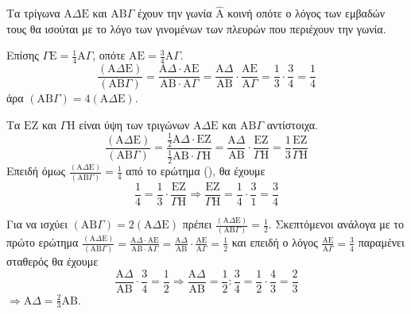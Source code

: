 \begin{alist}
    \item
    \begin{rlist}
        \item Τα τρίγωνα $\mathrm{A}\Delta\mathrm{E}$ και $\mathrm{AB}\Gamma$ έχουν την γωνία $\hat{\mathrm{A}}$ κοινή οπότε ο λόγος των εμβαδών τους θα ισούται με το λόγο των γινομένων των πλευρών που περιέχουν την γωνία.

        Επίσης $\Gamma\mathrm{E} = \frac{1}{4} \mathrm{A}\Gamma$, οπότε $\mathrm{A}\mathrm{E} = \frac{3}{4} \mathrm{A}\Gamma$.
        \[ \frac{(\mathrm{A}\Delta\mathrm{E})}{(\mathrm{AB}\Gamma)} = \frac{\mathrm{A}\Delta \cdot \mathrm{A}\mathrm{E}}{\mathrm{AB} \cdot \mathrm{A}\Gamma} = \frac{\mathrm{A}\Delta}{\mathrm{AB}} \cdot \frac{\mathrm{A}\mathrm{E}}{\mathrm{A}\Gamma} = \frac{1}{3} \cdot \frac{3}{4} = \frac{1}{4} \]
        άρα $(\mathrm{AB}\Gamma) = 4(\mathrm{A}\Delta\mathrm{E})$.

        \item Τα $\mathrm{EZ}$ και $\Gamma\mathrm{H}$ είναι ύψη των τριγώνων $\mathrm{A}\Delta\mathrm{E}$ και $\mathrm{AB}\Gamma$ αντίστοιχα.
        \[ \frac{(\mathrm{A}\Delta\mathrm{E})}{(\mathrm{AB}\Gamma)} = \frac{\frac{1}{2} \mathrm{A}\Delta \cdot \mathrm{EZ}}{\frac{1}{2} \mathrm{AB} \cdot \Gamma\mathrm{H}} = \frac{\mathrm{A}\Delta}{\mathrm{AB}} \cdot \frac{\mathrm{EZ}}{\Gamma\mathrm{H}} = \frac{1}{3} \frac{\mathrm{EZ}}{\Gamma\mathrm{H}} \]
        Επειδή όμως $\frac{(\mathrm{A}\Delta\mathrm{E})}{(\mathrm{AB}\Gamma)} = \frac{1}{4}$ από το ερώτημα (\textalpha), θα έχουμε
        \[ \frac{1}{4} = \frac{1}{3} \cdot \frac{\mathrm{EZ}}{\Gamma\mathrm{H}} \Rightarrow \frac{\mathrm{EZ}}{\Gamma\mathrm{H}} = \frac{1}{4} \cdot \frac{3}{1} = \frac{3}{4} \]
    \end{rlist}

    \item Για να ισχύει $(\mathrm{AB}\Gamma) = 2(\mathrm{A}\Delta\mathrm{E})$ πρέπει $\frac{(\mathrm{A}\Delta\mathrm{E})}{(\mathrm{AB}\Gamma)} = \frac{1}{2}$. Σκεπτόμενοι ανάλογα με το πρώτο ερώτημα $\frac{(\mathrm{A}\Delta\mathrm{E})}{(\mathrm{AB}\Gamma)} = \frac{\mathrm{A}\Delta \cdot \mathrm{A}\mathrm{E}}{\mathrm{AB} \cdot \mathrm{A}\Gamma} = \frac{\mathrm{A}\Delta}{\mathrm{AB}} \cdot \frac{\mathrm{A}\mathrm{E}}{\mathrm{A}\Gamma} = \frac{1}{2}$ και επειδή ο λόγος $\frac{\mathrm{A}\mathrm{E}}{\mathrm{A}\Gamma} = \frac{3}{4}$ παραμένει σταθερός θα έχουμε
    \[ \frac{\mathrm{A}\Delta}{\mathrm{AB}} \cdot \frac{3}{4} = \frac{1}{2} \Rightarrow \frac{\mathrm{A}\Delta}{\mathrm{AB}} = \frac{1}{2} : \frac{3}{4} = \frac{1}{2} \cdot \frac{4}{3} = \frac{2}{3} \]
    $\Rightarrow \mathrm{A}\Delta = \frac{2}{3} \mathrm{AB}$.
\end{alist}